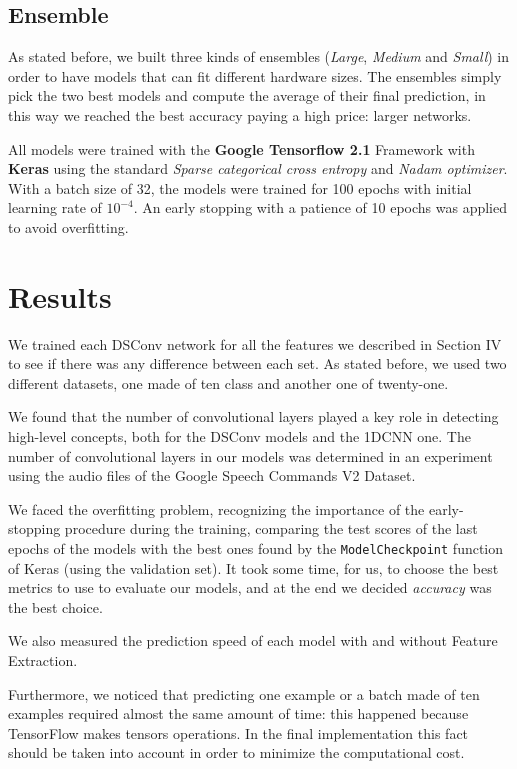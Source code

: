 \documentclass[conference]{IEEEtran}
\begin{document}
\subsection{Ensemble}
\vspace{-1mm}
As stated before, we built three kinds of ensembles (\textit{Large}, \textit{Medium} and \textit{Small}) in order to have models that can fit different hardware sizes.  The ensembles simply pick the two best models and compute the average of their final prediction, in this way we reached the best accuracy paying a high price: larger networks.

All models were trained with the \textbf{Google Tensorflow 2.1} Framework with \textbf{Keras} using the standard \textit{Sparse categorical cross entropy} and \textit{Nadam optimizer}. With a batch size of 32, the models were trained for 100 epochs with initial learning rate of $10^{-4}$. An early stopping with a patience of 10 epochs was applied to avoid overfitting.

\section{Results}
We trained each DSConv network for all the features we described in Section IV to see if there was any difference between each set. As stated before, we used two different datasets, one made of ten class and another one of twenty-one.

We found that the number of convolutional layers played a key role in detecting high-level concepts, both for the DSConv models and the 1DCNN one. The number of convolutional layers in our models was determined in an experiment using the audio files of the Google Speech Commands V2 Dataset.

We faced the overfitting problem, recognizing the importance of the early-stopping procedure during the training, comparing the test scores of the last epochs of the models with the best ones found by the \texttt{ModelCheckpoint} function of Keras (using the validation set).
It took some time, for us, to choose the best metrics to use to evaluate our models, and at the end we decided \textit{accuracy} was the best choice.

We also measured the prediction speed of each model with and without Feature Extraction. 

Furthermore, we noticed that predicting one example or a batch made of ten examples required almost the same amount of time: this happened because TensorFlow makes tensors operations. In the final implementation this fact should be taken into account in order to minimize the computational cost.
\end{document}
